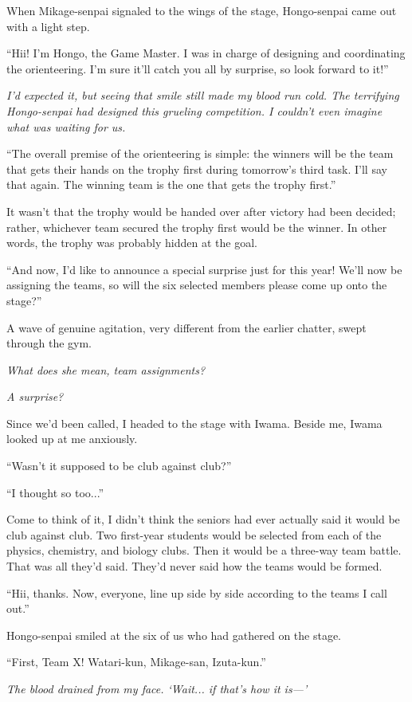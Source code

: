 \documentclass[
    a4paper,
    12pt,
    twoside,
    openany,
    UTF8,
    fontset=windows
]{ctexbook}
\begin{document}
When Mikage-senpai signaled to the wings of the stage, Hongo-senpai came out with a light step.

``Hii! I'm Hongo, the Game Master. I was in charge of designing and coordinating the orienteering. I'm sure it'll catch you all by surprise, so look forward to it!''

\textit{I'd expected it, but seeing that smile still made my blood run cold. The terrifying Hongo-senpai had designed this grueling competition. I couldn't even imagine what was waiting for us.}

``The overall premise of the orienteering is simple: the winners will be the team that gets their hands on the trophy first during tomorrow's third task. I'll say that again. The winning team is the one that gets the trophy first.''

It wasn't that the trophy would be handed over after victory had been decided; rather, whichever team secured the trophy first would be the winner. In other words, the trophy was probably hidden at the goal.

``And now, I'd like to announce a special surprise just for this year! We'll now be assigning the teams, so will the six selected members please come up onto the stage?''

A wave of genuine agitation, very different from the earlier chatter, swept through the gym.

\textit{What does she mean, team assignments?}

\textit{A surprise?}

Since we'd been called, I headed to the stage with Iwama. Beside me, Iwama looked up at me anxiously.

``Wasn't it supposed to be club against club?''

``I thought so too...''

Come to think of it, I didn't think the seniors had ever actually said it would be club against club. Two first-year students would be selected from each of the physics, chemistry, and biology clubs. Then it would be a three-way team battle. That was all they'd said. They'd never said how the teams would be formed.

``Hii, thanks. Now, everyone, line up side by side according to the teams I call out.''

Hongo-senpai smiled at the six of us who had gathered on the stage.

``First, Team X! Watari-kun, Mikage-san, Izuta-kun.''

\textit{The blood drained from my face. `Wait... if that's how it is---'}
\end{document}
